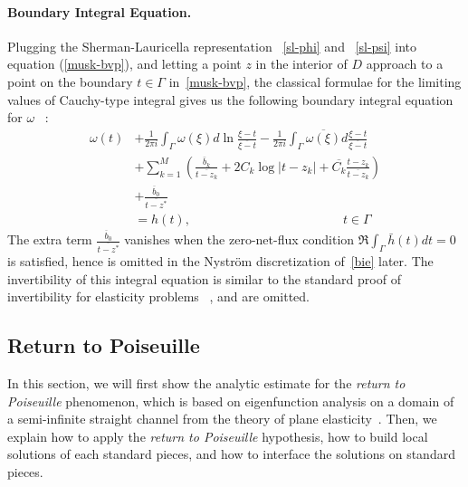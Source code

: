 \documentclass[10pt,twocolumn,letterpaper]{article}
\begin{document}
\paragraph{Boundary Integral Equation.} 
Plugging the Sherman-Lauricella representation
~\eqref{sl-phi} and ~\eqref{sl-psi} into equation (\ref{musk-bvp}), 
and letting a point $z$ in the interior of $D$ approach to 
a point on the boundary $t\in \Gamma$ in~\eqref{musk-bvp}, 
the classical formulae for the limiting values of Cauchy-type integral gives us 
the following boundary integral equation for $\omega$
~\cite{muschelisviliSingularIntegralEquations1972,greengardIntegralEquationMethods1996}:
\begin{align}
  \omega(t)
   & + \frac 1{2\pi i} \int_{\Gamma} \omega(\xi) d\ln \frac{\xi - t}{\overline{\xi - t}} - \frac 1{2\pi i} \int_\Gamma \overline{\omega(\xi)} d \frac{\xi - t}{\overline{\xi - t}} \label{bie} \\
   & + \sum_{k=1}^M \left( \frac{\bar b_k}{\overline{t- z_k}} +  2C_k \log |t-z_k| + \overline{C_k} \frac{t-z_k}{\overline{ t - z_k}} \right) \nonumber                                        \\
   & + \frac{\overline b_0}{\overline{ t - z^*}} \nonumber\\
   & = h(t), 
   \quad\quad\quad\quad\quad\quad\quad\quad\quad\quad\quad\quad t\in \Gamma \nonumber
\end{align}
The extra term $\frac{\overline b_0}{\overline{t - z^*}}$ vanishes 
when the zero-net-flux condition $\Re \int_\Gamma \bar h(t) dt = 0$ is satisfied, 
hence is omitted in the Nystr\"om discretization of~\eqref{bie} later.
The invertibility of this integral equation is similar
to the standard proof of invertibility for elasticity problems
~\cite{muskhelishviliBasicProblemsMathematical1977,greengardIntegralEquationMethods1996}, 
and are omitted. 

\subsection{Return to Poiseuille\label{sec:ret2poi}}

In this section, we will first show the analytic estimate for the
\textit{return to Poiseuille} phenomenon, 
which is based on eigenfunction analysis on a domain of a semi-infinite straight channel 
from the theory of plane elasticity~\cite{gregoryTractionBoundaryValue1980}. 
Then, we explain how to apply the \textit{return to Poiseuille} hypothesis, 
how to build local solutions of each standard pieces, 
and how to interface the solutions on standard pieces. 
\end{document}
